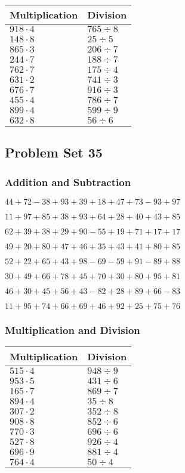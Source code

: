 \begin{longtable}[]{@{}ll@{}}
\toprule
Multiplication & Division\tabularnewline
\midrule
\endhead
\(918\cdot4\) & \(765÷8\)\tabularnewline
\(148\cdot8\) & \(25÷5\)\tabularnewline
\(865\cdot3\) & \(206÷7\)\tabularnewline
\(244\cdot7\) & \(188÷7\)\tabularnewline
\(762\cdot7\) & \(175÷4\)\tabularnewline
\(631\cdot2\) & \(741÷3\)\tabularnewline
\(676\cdot7\) & \(916÷3\)\tabularnewline
\(455\cdot4\) & \(786÷7\)\tabularnewline
\(899\cdot4\) & \(599÷9\)\tabularnewline
\(632\cdot8\) & \(56÷6\)\tabularnewline
\bottomrule
\end{longtable}

\hypertarget{problem-set-35}{%
\subsection{Problem Set 35}\label{problem-set-35}}

\hypertarget{addition-and-subtraction-34}{%
\subsubsection{Addition and
Subtraction}\label{addition-and-subtraction-34}}

\(44+72-38+93+39+18+47+73-93+97\)

\(11+97+85+38+93+64+28+40+43+85\)

\(62+39+38+29+90-55+19+71+17+17\)

\(49+20+80+47+46+35+43+41+80+85\)

\(52+22+65+43+98-69-59+91-89+88\)

\(30+49+66+78+45+70+30+80+95+81\)

\(46+30+45+56+43-82+28+89+66-83\)

\(11+95+74+66+69+46+92+25+75+76\)

\hypertarget{multiplication-and-division-34}{%
\subsubsection{Multiplication and
Division}\label{multiplication-and-division-34}}

\begin{longtable}[]{@{}ll@{}}
\toprule
Multiplication & Division\tabularnewline
\midrule
\endhead
\(515\cdot4\) & \(948÷9\)\tabularnewline
\(953\cdot5\) & \(431÷6\)\tabularnewline
\(165\cdot7\) & \(869÷7\)\tabularnewline
\(894\cdot4\) & \(35÷8\)\tabularnewline
\(307\cdot2\) & \(352÷8\)\tabularnewline
\(908\cdot8\) & \(852÷6\)\tabularnewline
\(770\cdot3\) & \(696÷6\)\tabularnewline
\(527\cdot8\) & \(926÷4\)\tabularnewline
\(696\cdot9\) & \(881÷4\)\tabularnewline
\(764\cdot4\) & \(50÷4\)\tabularnewline
\bottomrule
\end{longtable}

